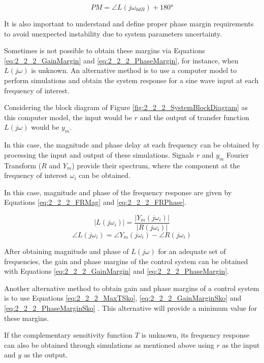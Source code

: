 \begin{equation}
\label{eq:2_2_2_PhaseMargin}
PM = \angle L(j\omega_{0dB}) + 180°
\end{equation}

It is also important to understand and define proper phase margin requirements to avoid unexpected instability due to system parameters uncertainty.

Sometimes is not possible to obtain these margins via Equations \ref{eq:2_2_2_GainMargin} and \ref{eq:2_2_2_PhaseMargin}, for instance, when $L(j\omega)$ is unknown. An alternative method is to use a computer model to perform simulations and obtain the system response for a sine wave input at each frequency of interest.

Considering the block diagram of Figure \ref{fig:2_2_2_SystemBlockDiagram} as this computer model, the input would be $r$ and the output of transfer function $L(j\omega)$ would be $y_m$.

In this case, the magnitude and phase delay at each frequency can be obtained by processing the input and output of these simulations. Signals $r$ and $y_m$ Fourier Transform ($R$ and $Y_m$) provide their spectrum, where the component at the frequency of interest $\omega_i$ can be obtained. 

In this case, magnitude and phase of the frequency response are given by Equations \ref{eq:2_2_2_FRMag} and \ref{eq:2_2_2_FRPhase}.

\begin{equation}
\label{eq:2_2_2_FRMag}
|L(j\omega_i)| = \frac{|Y_m(j\omega_i)|}{|R(j\omega_i)|}
\end{equation}
\begin{equation}
\label{eq:2_2_2_FRPhase}
\angle L(j\omega_i) = \angle Y_m(j\omega_i) - \angle R(j\omega_i)
\end{equation}

After obtaining magnitude and phase of $L(j\omega)$ for an adequate set of frequencies, the gain and phase margins of the control system can be obtained with Equations \ref{eq:2_2_2_GainMargin} and \ref{eq:2_2_2_PhaseMargin}.

Another alternative method to obtain gain and phase margins of a control system is to use Equations 
\ref{eq:2_2_2_MaxTSko}, \ref{eq:2_2_2_GainMarginSko} and \ref{eq:2_2_2_PhaseMarginSko} \cite{Skogestad}. This alternative will provide a minimum value for these margins. 

If the complementary sensitivity function $T$ is unknown, its frequency response can also be obtained through simulations as mentioned above using $r$ as the input and $y$ as the output.

